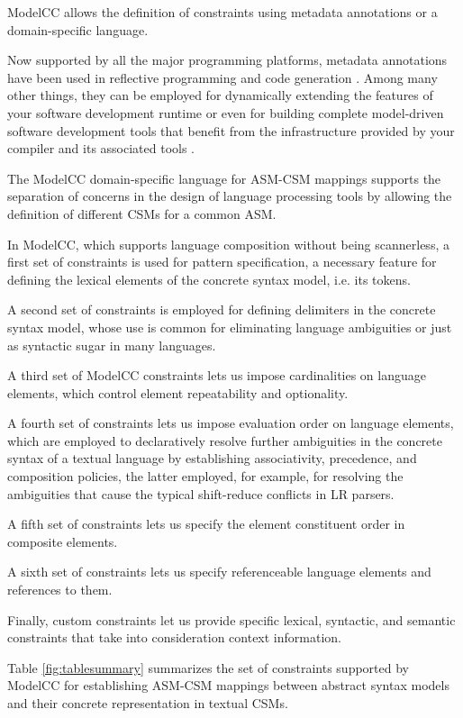 \documentclass[preprint]{elsarticle}
\begin{document}
ModelCC allows the definition of constraints using metadata annotations or a domain-specific language.

Now supported by all the major programming platforms, metadata annotations have been used in reflective programming and code generation \cite{Fowler2002}.
Among many other things, they can be employed for dynamically extending the features of your software development runtime \cite{Berzal2005} or even for building complete model-driven software development tools that benefit from the infrastructure provided by your compiler and its associated tools \cite{mdsd-ideal}.

The ModelCC domain-specific language for ASM-CSM mappings \cite{Quesada2014b} supports the separation of concerns in the design of language processing tools by allowing the definition of different CSMs for a common ASM.

In ModelCC, which supports language composition without being scannerless, a first set of constraints is used for pattern specification, a necessary feature for defining the lexical elements of the concrete syntax model, i.e. its tokens.

A second set of constraints is employed for defining delimiters in the concrete syntax model, whose use is common for eliminating language ambiguities or just as syntactic sugar in many languages.

A third set of ModelCC constraints lets us impose cardinalities on language elements, which control element repeatability and optionality.

A fourth set of constraints lets us impose evaluation order on language elements, which are employed to declaratively resolve further ambiguities in the concrete syntax of a textual language by establishing associativity, precedence, and composition policies, the latter employed, for example, for resolving the ambiguities that cause the typical shift-reduce conflicts in LR parsers.

A fifth set of constraints lets us specify the element constituent order in composite elements.

A sixth set of constraints lets us specify referenceable language elements and references to them.

Finally, custom constraints let us provide specific lexical, syntactic, and semantic constraints that take into consideration context information.

Table \ref{fig:tablesummary} summarizes the set of constraints supported by ModelCC for establishing ASM-CSM mappings between abstract syntax models and their concrete representation in textual CSMs.
\end{document}
